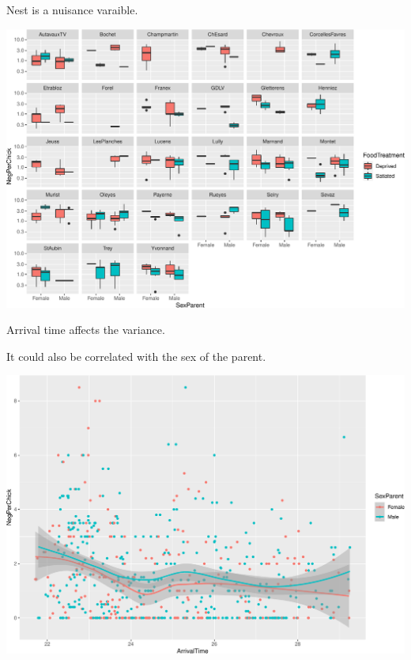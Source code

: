 \documentclass[
  ignorenonframetext,
]{beamer}
\begin{document}
\begin{frame}{Nest is a nuisance varaible.}
\protect\hypertarget{nest-is-a-nuisance-varaible.}{}

\scriptsize

\includegraphics{mixed_models_files/figure-beamer/unnamed-chunk-5-1.pdf}

\end{frame}

\begin{frame}{Arrival time affects the variance.}
\protect\hypertarget{arrival-time-affects-the-variance.}{}

It could also be correlated with the sex of the parent.

\scriptsize

\includegraphics{mixed_models_files/figure-beamer/unnamed-chunk-6-1.pdf}

\end{frame}
\end{document}
